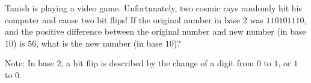 Tanish is playing a video game. Unfortunately, two cosmic rays randomly hit his computer and cause two bit flips! If the original number in base $2$ was $110101110$, and the positive difference between the original number and new number (in base $10$) is $56$, what is the new number (in base $10$)?



Note: In base $2$, a bit flip is described by the change of a digit from $0$ to $1$, or $1$ to $0$.
